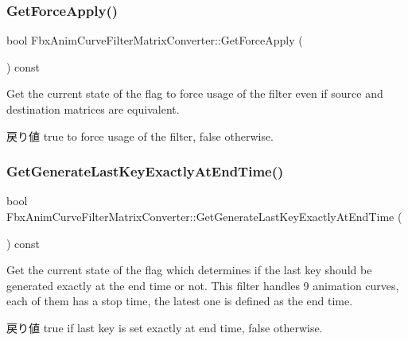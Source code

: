 \subsubsection{\texorpdfstring{Get\+Force\+Apply()}{GetForceApply()}}
{\footnotesize\ttfamily bool Fbx\+Anim\+Curve\+Filter\+Matrix\+Converter\+::\+Get\+Force\+Apply (\begin{DoxyParamCaption}{ }\end{DoxyParamCaption}) const}

Get the current state of the flag to force usage of the filter even if source and destination matrices are equivalent. \begin{DoxyReturn}{戻り値}
{\ttfamily true} to force usage of the filter, {\ttfamily false} otherwise. 
\end{DoxyReturn}
\mbox{\label{class_fbx_anim_curve_filter_matrix_converter_a2721fda063f33bb95358c60df9a935f7}} 
\subsubsection{\texorpdfstring{Get\+Generate\+Last\+Key\+Exactly\+At\+End\+Time()}{GetGenerateLastKeyExactlyAtEndTime()}}
{\footnotesize\ttfamily bool Fbx\+Anim\+Curve\+Filter\+Matrix\+Converter\+::\+Get\+Generate\+Last\+Key\+Exactly\+At\+End\+Time (\begin{DoxyParamCaption}{ }\end{DoxyParamCaption}) const}

Get the current state of the flag which determines if the last key should be generated exactly at the end time or not. This filter handles 9 animation curves, each of them has a stop time, the latest one is defined as the end time. \begin{DoxyReturn}{戻り値}
{\ttfamily true} if last key is set exactly at end time, {\ttfamily false} otherwise. 
\end{DoxyReturn}
\mbox{\label{class_fbx_anim_curve_filter_matrix_converter_a264eb163214f398627f4b8e20631b1ab}} 
